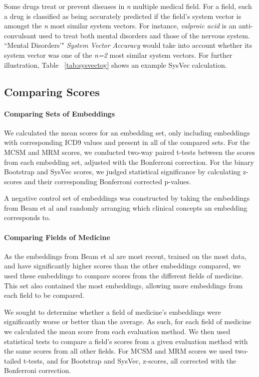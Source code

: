\documentclass[11pt,a4paper]{article}
\begin{document}
Some drugs treat or prevent diseases in \emph{n} multiple medical field. For a field, such a drug is classified as being accurately predicted if the field's system vector is amongst the \emph{n} most similar system vectors. For instance, \emph{valproic acid} is an anti-convulsant used to treat both mental disorders and those of the nervous system. ``Mental Disorders'" \emph{System Vector Accuracy} would take into account whether its system vector was one of the \emph{n=2} most similar system vectors. For further illustration, Table ~\ref{tab:sysvectoy} shows an example SysVec calculation.



\subsection{Comparing Scores}

\paragraph{Comparing Sets of Embeddings}We calculated the mean scores for an embedding set, only including embeddings with corresponding ICD9 values and present in all of the compared sets. For the MCSM and MRM scores, we conducted two-way paired t-tests between the scores from each embedding set, adjusted with the Bonferroni correction. For the binary Bootstrap and SysVec scores, we judged statistical significance by calculating z-scores and their corresponding Bonferroni corrected p-values. 

A negative control set of embeddings was constructed by taking the embeddings from Beam et al  and randomly arranging which clinical concepts an embedding corresponds to. 

\paragraph{Comparing Fields of Medicine} As the embeddings from Beam et al  are most recent, trained on the most data, and have significantly higher scores than the other embeddings compared, we used these embeddings to compare scores from the different fields of medicine. This set also contained the most embeddings, allowing more embeddings from each field to be compared. 

We sought to determine whether a field of medicine's embeddings were significantly worse or better than the average. As such, for each field of medicine we calculated the mean score from each evaluation method. We then used statistical tests to compare a field's scores from a given evaluation method with the same scores from all other fields. For MCSM and MRM scores we used two-tailed t-tests, and for Bootstrap and SysVec, z-scores, all corrected with the Bonferroni correction. 
\end{document}

